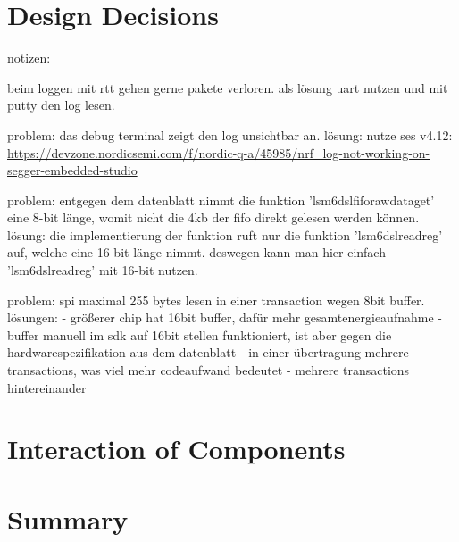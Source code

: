 \section{Design Decisions}

notizen:

beim loggen mit rtt gehen gerne pakete verloren. als lösung uart nutzen und mit putty den log lesen.

problem: das debug terminal zeigt den log unsichtbar an.
lösung: nutze ses v4.12: \url{https://devzone.nordicsemi.com/f/nordic-q-a/45985/nrf_log-not-working-on-segger-embedded-studio}

problem: entgegen dem datenblatt nimmt die funktion 'lsm6dsl\textunderscore fifo\textunderscore raw\textunderscore data\textunderscore get' eine 8-bit länge, womit nicht die 4kb der fifo direkt gelesen werden können.
lösung:
die implementierung der funktion ruft nur die funktion 'lsm6dsl\textunderscore read\textunderscore reg' auf, welche eine 16-bit länge nimmt. deswegen kann man hier einfach 'lsm6dsl\textunderscore read\textunderscore reg' mit 16-bit nutzen.

problem: spi maximal 255 bytes lesen in einer transaction wegen 8bit buffer.
lösungen:
- größerer chip hat 16bit buffer, dafür mehr gesamtenergieaufnahme
- buffer manuell im sdk auf 16bit stellen funktioniert, ist aber gegen die hardwarespezifikation aus dem datenblatt
- in einer übertragung mehrere transactions, was viel mehr codeaufwand bedeutet
- mehrere transactions hintereinander



\section{Interaction of Components}

\section{Summary}
